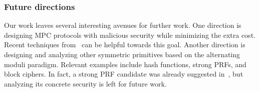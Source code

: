 \subsubsection{Future directions} Our work leaves several interesting avenues for further work. One direction is designing MPC protocols with malicious security while minimizing the extra cost. Recent techniques from~\cite{BBCGI19,BGIN19} can be helpful towards this goal. Another direction is designing and analyzing other symmetric primitives based on the alternating moduli paradigm. Relevant examples include hash functions, strong PRFs, and block ciphers. In fact, a strong PRF candidate was already suggested in~\cite{boneh2018-darkmatter}, but analyzing its concrete security is left for future work.

